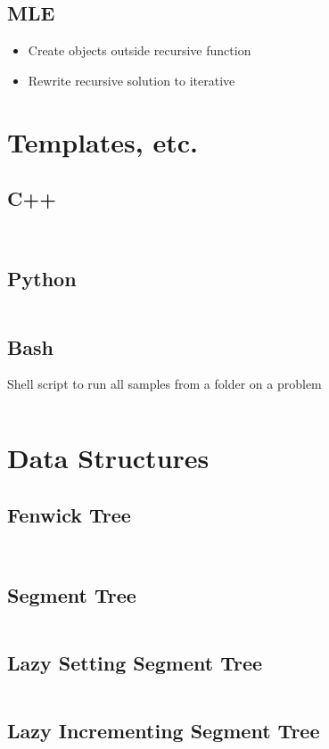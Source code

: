\documentclass[8pt,a4paper,landscape,oneside]{amsart}
\newcommand{\codec}[1]{\inputminted[fontsize=\large,tabsize=2,baselinestretch=1]{cpp}{code/#1}}
\newcommand{\codep}[1]{\inputminted[fontsize=\large,tabsize=2,baselinestretch=1]{py}{code/#1}}
\newcommand{\codeb}[1]{\inputminted[fontsize=\large,tabsize=2,baselinestretch=1]{bash}{code/#1}}
\begin{document}
\begin{multicols*}{2}
\begin{large}
\subsection{MLE}
\begin{itemize}
    \item Create objects outside recursive function
    \item Rewrite recursive solution to iterative
\end{itemize}
\section{Templates, etc.}
\subsection{C++}
\codec{template.cpp}
\codec{input.cpp}
\subsection{Python}
\codep{template.py}
\subsection{Bash}
Shell script to run all samples from a folder on a problem
\codeb{run.sh}
\section{Data Structures}
\subsection{Fenwick Tree}
\codep{fenwicktree.py}
\codec{fenwicktree.cpp}
\subsection{Segment Tree}
\codep{sgmtree.cpp}
\subsection{Lazy Setting Segment Tree}
\codec{lazysetsgmtree.cpp}
\subsection{Lazy Incrementing Segment Tree}
\codec{lazyincsgmtree.cpp}

\end{large}
\end{multicols*}
\end{document}
